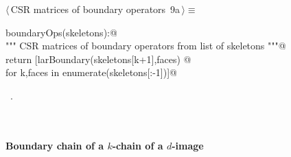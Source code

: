 \documentclass[11pt,oneside]{article}	%
\begin{document}
\begin{flushleft} \small
\begin{minipage}{\linewidth} \label{scrap13}
\protect{}$\langle\,$CSR matrices of boundary operators\nobreak\ {\footnotesize 9a}$\,\rangle\equiv$
\vspace{-1ex}
\begin{list}{}{} \item
\mbox{}\verb@def boundaryOps(skeletons):@\\
\mbox{}\verb@   """ CSR matrices of boundary operators from list of skeletons """@\\
\mbox{}\verb@   return [larBoundary(skeletons[k+1],faces) @\\
\mbox{}\verb@      for k,faces in enumerate(skeletons[:-1])]@\\
\mbox{}\verb@@{\NWsep}
\end{list}
\vspace{-1ex}
\footnotesize\addtolength{\baselineskip}{-1ex}
\begin{list}{}{\setlength{\itemsep}{-\parsep}\setlength{\itemindent}{-\leftmargin}}
\item \NWtxtMacroRefIn\ .
\end{list}
\end{minipage}\\[4ex]
\end{flushleft}


\paragraph{Boundary chain of a $k$-chain of a $d$-image}
\end{document}
